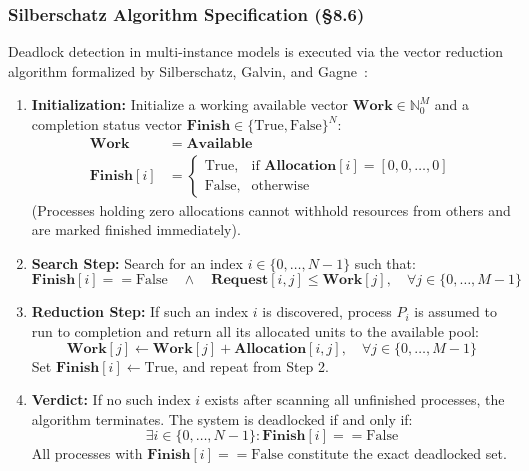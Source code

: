\documentclass[11pt,a4paper]{article}
\begin{document}
\subsubsection{Silberschatz Algorithm Specification (§8.6)}
Deadlock detection in multi-instance models is executed via the vector reduction algorithm formalized by Silberschatz, Galvin, and Gagne~\cite{silberschatz2018operating}:
\begin{enumerate}
    \item \textbf{Initialization:} Initialize a working available vector $\mathbf{Work} \in \mathbb{N}_0^M$ and a completion status vector $\mathbf{Finish} \in \{\text{True}, \text{False}\}^N$:
    \begin{align}
        \mathbf{Work} &= \mathbf{Available} \\
        \mathbf{Finish}[i] &= \begin{cases}
            \text{True}, & \text{if } \mathbf{Allocation}[i] = [0, 0, \dots, 0] \\
            \text{False}, & \text{otherwise}
        \end{cases}
    \end{align}
    (Processes holding zero allocations cannot withhold resources from others and are marked finished immediately).
    \item \textbf{Search Step:} Search for an index $i \in \{0, \dots, N-1\}$ such that:
    \begin{equation}
        \mathbf{Finish}[i] == \text{False} \quad \wedge \quad \mathbf{Request}[i, j] \le \mathbf{Work}[j], \quad \forall j \in \{0, \dots, M-1\}
    \end{equation}
    \item \textbf{Reduction Step:} If such an index $i$ is discovered, process $P_i$ is assumed to run to completion and return all its allocated units to the available pool:
    \begin{equation}
        \mathbf{Work}[j] \leftarrow \mathbf{Work}[j] + \mathbf{Allocation}[i, j], \quad \forall j \in \{0, \dots, M-1\}
    \end{equation}
    Set $\mathbf{Finish}[i] \leftarrow \text{True}$, and repeat from Step 2.
    \item \textbf{Verdict:} If no such index $i$ exists after scanning all unfinished processes, the algorithm terminates. The system is deadlocked if and only if:
    \begin{equation}
        \exists i \in \{0, \dots, N-1\} : \mathbf{Finish}[i] == \text{False}
    \end{equation}
    All processes with $\mathbf{Finish}[i] == \text{False}$ constitute the exact deadlocked set.
\end{enumerate}
\end{document}
